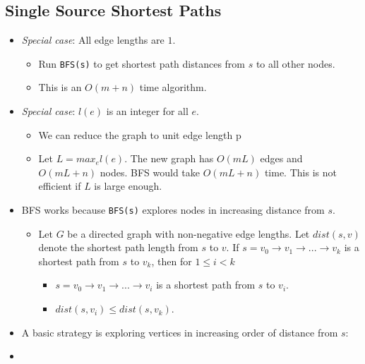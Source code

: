 \documentclass[12pt]{article}
\begin{document}
\subsection{Single Source Shortest Paths}
\begin{itemize}
    \item \textit{Special case}: All edge lengths are $1$.
    \begin{itemize}
        \item Run \texttt{BFS(s)} to get shortest path distances from $s$ to all other nodes.
        \item This is an $O(m + n)$ time algorithm.
    \end{itemize}
    \item \textit{Special case}: $l(e)$ is an integer for all $e$.
    \begin{itemize}
        \item We can reduce the graph to unit edge length p
        \item Let $L = max_e l(e)$. The new graph has $O(mL)$ edges and $O(mL + n)$ nodes. BFS would take $O(mL + n)$ time. This is not efficient if $L$ is large enough.
    \end{itemize}
    \item BFS works because \texttt{BFS(s)} explores nodes in increasing distance from $s$.
    \begin{itemize}
        \item Let $G$ be a directed graph with non-negative edge lengths. Let $dist(s, v)$ denote the shortest path length from $s$ to $v$. If $s = v_0 \rightarrow v_1 \rightarrow ... \rightarrow v_k$ is a shortest path from $s$ to $v_k$, then for $1 \leq i < k$
        \begin{itemize}
            \item $s = v_0 \rightarrow v_1 \rightarrow ... \rightarrow v_i$ is a shortest path from $s$ to $v_i$.
            \item $dist(s, v_i) \leq dist(s, v_k)$.
        \end{itemize}
    \end{itemize}
    \item A basic strategy is exploring vertices in increasing order of distance from $s$:
    \item[] 
\end{itemize}
\end{document}
